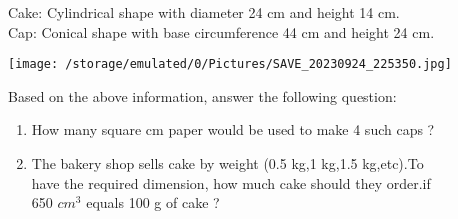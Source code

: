 \documentclass[15pt]{article}
\begin{document}
\begin{enumerate}
            Cake: Cylindrical shape with diameter 24 cm and height 14 cm.\\
            Cap: Conical shape with base circumference 44 cm and height 24 cm.
            \begin{center}
                \texttt{[image:           /storage/emulated/0/Pictures/SAVE\_20230924\_225350.jpg]}
            \end{center}
             Based on the above information, answer the following question:
            \begin{enumerate}
          \item How many square cm paper would be used to make 4 such caps ?
      \hspace{5cm}   \item  The bakery shop sells cake by weight (0.5 kg,1 kg,1.5 kg,etc).To\\ have the required dimension, how much cake should they order.if\\ 650 $cm^3$  equals 100 g of cake ?
            \end{enumerate}
 \end{enumerate}
\end{document}
